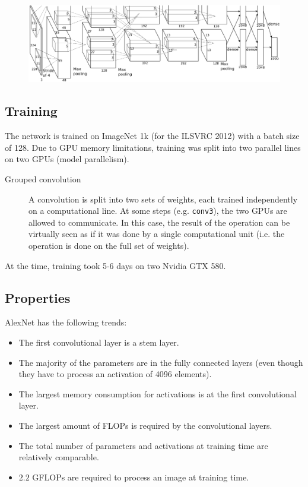 \begin{figure}[H]
    \centering
    \includegraphics[width=0.8\linewidth]{./img/alexnet.png}
\end{figure}


\subsection{Training}

The network is trained on ImageNet 1k (for the ILSVRC 2012) with a batch size of 128.
Due to GPU memory limitations, training was split into two parallel lines on two GPUs (model parallelism).

\begin{description}
    \item[Grouped convolution] 
        A convolution is split into two sets of weights, each trained independently on a computational line.
        At some steps (e.g. \texttt{conv3}), the two GPUs are allowed to communicate.
        In this case, the result of the operation can be virtually seen as if it was done by a single computational unit (i.e. the operation is done on the full set of weights).
\end{description}

\begin{remark}
    At the time, training took 5-6 days on two Nvidia GTX 580.
\end{remark}


\subsection{Properties}

AlexNet has the following trends:
\begin{itemize}
    \item The first convolutional layer is a stem layer.
    \item The majority of the parameters are in the fully connected layers (even though they have to process an activation of 4096 elements).
    \item The largest memory consumption for activations is at the first convolutional layer.
    \item The largest amount of FLOPs is required by the convolutional layers.
    \item The total number of parameters and activations at training time are relatively comparable.
    \item $2.2$ GFLOPs are required to process an image at training time.
\end{itemize}


